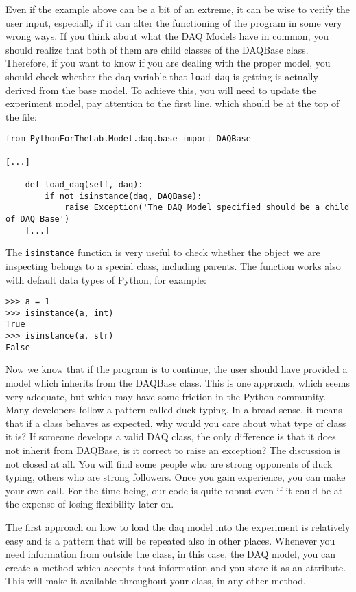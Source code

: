 Even if the example above can be a bit of an extreme, it can be wise to verify the user input, especially if it can alter the functioning of the program in some very wrong ways. If you think about what the {DAQ} Models have in common, you should realize that both of them are child classes of the DAQBase class. Therefore, if you want to know if you are dealing with the proper model, you should check whether the daq variable that \texttt{load_daq} is getting is actually derived from the base model. To achieve this, you will need to update the experiment model, pay attention to the first line, which should be at the top of the file:

\begin{verbatim}
from PythonForTheLab.Model.daq.base import DAQBase

[...]

    def load_daq(self, daq):
        if not isinstance(daq, DAQBase):
            raise Exception('The DAQ Model specified should be a child of DAQ Base')
    [...]
\end{verbatim}

The \texttt{isinstance} function is very useful to check whether the object we are inspecting belongs to a special class, including parents. The function works also with default data types of Python, for example:

\begin{verbatim}
>>> a = 1
>>> isinstance(a, int)
True
>>> isinstance(a, str)
False
\end{verbatim}

Now we know that if the program is to continue, the user should have provided a model which inherits from the DAQBase class. This is one approach, which seems very adequate, but which may have some friction in the Python community. Many developers follow a pattern called duck typing. In a broad sense, it means that if a class behaves as expected, why would you care about what type of class it is? If someone develops a valid DAQ class, the only difference is that it does not inherit from DAQBase, is it correct to raise an exception? The discussion is not closed at all. You will find some people who are strong opponents of duck typing, others who are strong followers. Once you gain experience, you can make your own call. For the time being, our code is quite robust even if it could be at the expense of losing flexibility later on. 

The first approach on how to load the daq model into the experiment is relatively easy and is a pattern that will be repeated also in other places. Whenever you need information from outside the class, in this case, the DAQ model, you can create a method which accepts that information and you store it as an attribute. This will make it available throughout your class, in any other method. 

